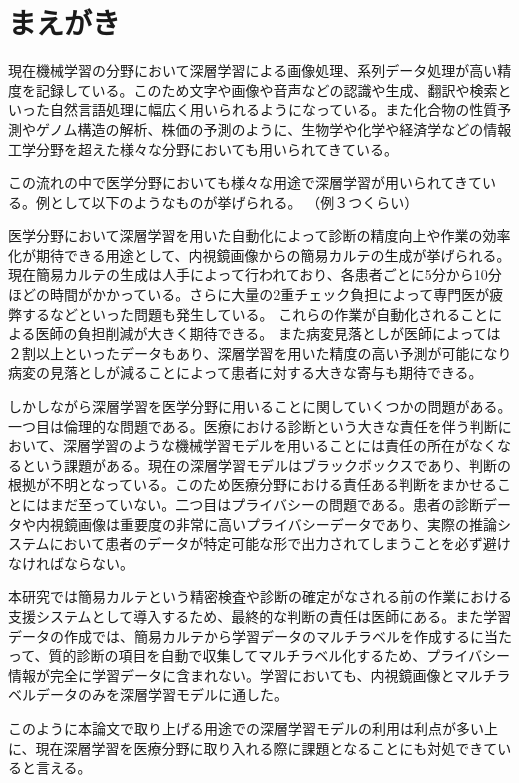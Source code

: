 \section{まえがき}
現在機械学習の分野において深層学習による画像処理、系列データ処理が高い精度を記録している。このため文字や画像や音声などの認識や生成、翻訳や検索といった自然言語処理に幅広く用いられるようになっている。また化合物の性質予測やゲノム構造の解析、株価の予測のように、生物学や化学や経済学などの情報工学分野を超えた様々な分野においても用いられてきている。

この流れの中で医学分野においても様々な用途で深層学習が用いられてきている。例として以下のようなものが挙げられる。
（例３つくらい）

医学分野において深層学習を用いた自動化によって診断の精度向上や作業の効率化が期待できる用途として、内視鏡画像からの簡易カルテの生成が挙げられる。現在簡易カルテの生成は人手によって行われており、各患者ごとに5分から10分ほどの時間がかかっている。さらに大量の2重チェック負担によって専門医が疲弊するなどといった問題も発生している。
これらの作業が自動化されることによる医師の負担削減が大きく期待できる。
また病変見落としが医師によっては２割以上といったデータもあり、深層学習を用いた精度の高い予測が可能になり病変の見落としが減ることによって患者に対する大きな寄与も期待できる。

しかしながら深層学習を医学分野に用いることに関していくつかの問題がある。一つ目は倫理的な問題である。医療における診断という大きな責任を伴う判断において、深層学習のような機械学習モデルを用いることには責任の所在がなくなるという課題がある。現在の深層学習モデルはブラックボックスであり、判断の根拠が不明となっている。このため医療分野における責任ある判断をまかせることにはまだ至っていない。二つ目はプライバシーの問題である。患者の診断データや内視鏡画像は重要度の非常に高いプライバシーデータであり、実際の推論システムにおいて患者のデータが特定可能な形で出力されてしまうことを必ず避けなければならない。

本研究では簡易カルテという精密検査や診断の確定がなされる前の作業における支援システムとして導入するため、最終的な判断の責任は医師にある。また学習データの作成では、簡易カルテから学習データのマルチラベルを作成するに当たって、質的診断の項目を自動で収集してマルチラベル化するため、プライバシー情報が完全に学習データに含まれない。学習においても、内視鏡画像とマルチラベルデータのみを深層学習モデルに通した。

このように本論文で取り上げる用途での深層学習モデルの利用は利点が多い上に、現在深層学習を医療分野に取り入れる際に課題となることにも対処できていると言える。

